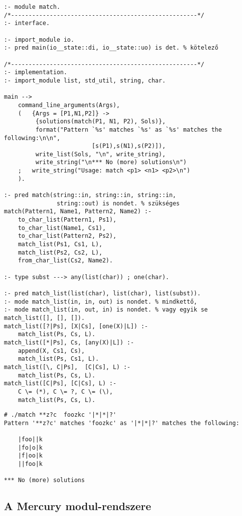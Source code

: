 \begin{verbatim}
:- module match.
/*-----------------------------------------------------*/
:- interface.

:- import_module io.
:- pred main(io__state::di, io__state::uo) is det. % kötelező

/*-----------------------------------------------------*/
:- implementation.
:- import_module list, std_util, string, char.

main --> 
    command_line_arguments(Args),
    (   {Args = [P1,N1,P2]} ->
         {solutions(match(P1, N1, P2), Sols)},
         format("Pattern `%s' matches `%s' as `%s' matches the following:\n\n",
                         [s(P1),s(N1),s(P2)]),
         write_list(Sols, "\n", write_string),
         write_string("\n*** No (more) solutions\n")
    ;   write_string("Usage: match <p1> <n1> <p2>\n")
    ).

:- pred match(string::in, string::in, string::in,
               string::out) is nondet. % szükséges
match(Pattern1, Name1, Pattern2, Name2) :-
    to_char_list(Pattern1, Ps1),
    to_char_list(Name1, Cs1),
    to_char_list(Pattern2, Ps2),
    match_list(Ps1, Cs1, L),
    match_list(Ps2, Cs2, L),
    from_char_list(Cs2, Name2).

:- type subst ---> any(list(char)) ; one(char).

:- pred match_list(list(char), list(char), list(subst)).
:- mode match_list(in, in, out) is nondet. % mindkettő,
:- mode match_list(in, out, in) is nondet. % vagy egyik se
match_list([], [], []).
match_list([?|Ps], [X|Cs], [one(X)|L]) :-
    match_list(Ps, Cs, L).
match_list([*|Ps], Cs, [any(X)|L]) :-
    append(X, Cs1, Cs),
    match_list(Ps, Cs1, L).
match_list([\, C|Ps],  [C|Cs], L) :-
    match_list(Ps, Cs, L).
match_list([C|Ps], [C|Cs], L) :-
    C \= (*), C \= ?, C \= (\), 
    match_list(Ps, Cs, L).
\end{verbatim}

\begin{verbatim}
# ./match **z?c  foozkc '|*|*|?'
Pattern '**z?c' matches 'foozkc' as '|*|*|?' matches the following:

    |foo||k
    |fo|o|k
    |f|oo|k
    ||foo|k

*** No (more) solutions
\end{verbatim}

\subsection{A Mercury modul-rendszere}

